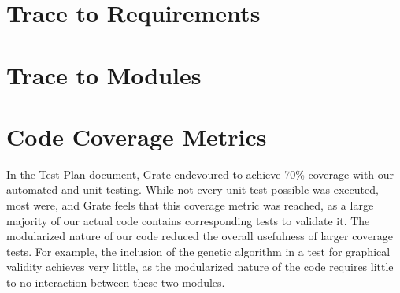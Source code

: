 \documentclass[12pt, titlepage]{article}
\begin{document}
\section{Trace to Requirements}
		
\section{Trace to Modules}		

\section{Code Coverage Metrics}

In the Test Plan document, Grate endevoured to achieve 70\% coverage with our automated and unit testing. While not every unit test possible was executed, most were, and Grate feels that this coverage metric was reached, as a large majority of our actual code contains corresponding tests to validate it. The modularized nature of our code reduced the overall usefulness of larger coverage tests. For example, the inclusion of the genetic algorithm in a test for graphical validity achieves very little, as the modularized nature of the code requires little to no interaction between these two modules.
\end{document}
